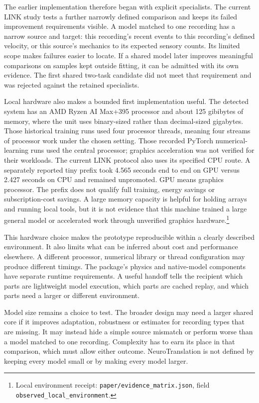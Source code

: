 The earlier implementation therefore began with explicit specialists. The current LINK study tests a further narrowly defined comparison and keeps its failed improvement requirements visible. A model matched to one recording has a narrow source and target: this recording's recent events to this recording's defined velocity, or this source's mechanics to its expected sensory counts. Its limited scope makes failures easier to locate. If a shared model later improves meaningful comparisons on samples kept outside fitting, it can be admitted with its own evidence. The first shared two-task candidate did not meet that requirement and was rejected against the retained specialists.

Local hardware also makes a bounded first implementation useful. The detected system has an AMD Ryzen AI Max+395 processor and about 125 gibibytes of memory, where the unit uses binary-sized rather than decimal-sized gigabytes. Those historical training runs used four processor threads, meaning four streams of processor work under the chosen setting. Those recorded PyTorch numerical-learning runs used the central processor; graphics acceleration was not verified for their workloads. The current LINK protocol also uses its specified CPU route. A separately reported tiny prefix took 4.565 seconds end to end on GPU versus 2.427 seconds on CPU and remained unpromoted. GPU means graphics processor. The prefix does not qualify full training, energy savings or subscription-cost savings. A large memory capacity is helpful for holding arrays and running local tools, but it is not evidence that this machine trained a large general model or accelerated work through unverified graphics hardware.\footnote{Local environment receipt: \texttt{paper/evidence\_matrix.json}, field \texttt{observed\_local\_environment}.}

This hardware choice makes the prototype reproducible within a clearly described environment. It also limits what can be inferred about cost and performance elsewhere. A different processor, numerical library or thread configuration may produce different timings. The package's physics and native-model components have separate runtime requirements. A useful handoff tells the recipient which parts are lightweight model execution, which parts are cached replay, and which parts need a larger or different environment.

Model size remains a choice to test. The broader design may need a larger shared core if it improves adaptation, robustness or estimates for recording types that are missing. It may instead hide a simple source mismatch or perform worse than a model matched to one recording. Complexity has to earn its place in that comparison, which must allow either outcome. NeuroTranslation is not defined by keeping every model small or by making every model larger.


